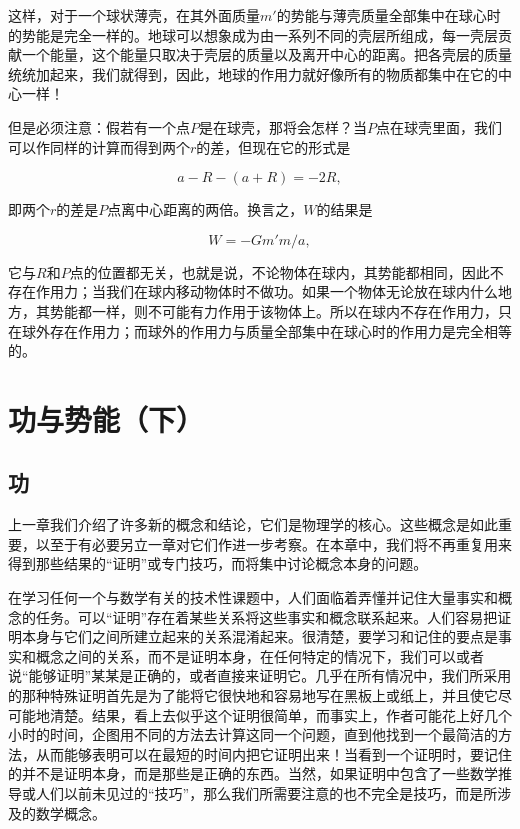 \documentclass[12pt,oneside]{book}
\begin{document}
这样，对于一个球状薄壳，在其外面质量$ m' $的势能与薄壳质量全部集中在球心时的势能是完全一样的。地球可以想象成为由一系列不同的壳层所组成，每一壳层贡献一个能量，这个能量只取决于壳层的质量以及离开中心的距离。把各壳层的质量统统加起来，我们就得到，因此，地球的作用力就好像所有的物质都集中在它的中心一样！

但是必须注意：假若有一个点$ P $是在球壳，那将会怎样？当$ P $点在球壳里面，我们可以作同样的计算而得到两个$ r $的差，但现在它的形式是

\begin{equation*}
a - R - (a + R) = -2R,
\end{equation*}

即两个$ r $的差是$ P $点离中心距离的两倍。换言之，$ W $的结果是

\begin{equation*}
W=-Gm'm/a ,
\end{equation*}

它与$ R $和$ P $点的位置都无关，也就是说，不论物体在球内，其势能都相同，因此不存在作用力；当我们在球内移动物体时不做功。如果一个物体无论放在球内什么地方，其势能都一样，则不可能有力作用于该物体上。所以在球内不存在作用力，只在球外存在作用力；而球外的作用力与质量全部集中在球心时的作用力是完全相等的。



\chapter{功与势能（下）}
\section{功}
上一章我们介绍了许多新的概念和结论，它们是物理学的核心。这些概念是如此重要，以至于有必要另立一章对它们作进一步考察。在本章中，我们将不再重复用来得到那些结果的“证明”或专门技巧，而将集中讨论概念本身的问题。


在学习任何一个与数学有关的技术性课题中，人们面临着弄懂并记住大量事实和概念的任务。可以“证明”存在着某些关系将这些事实和概念联系起来。人们容易把证明本身与它们之间所建立起来的关系混淆起来。很清楚，要学习和记住的要点是事实和概念之间的关系，而不是证明本身，在任何特定的情况下，我们可以或者说“能够证明”某某是正确的，或者直接来证明它。几乎在所有情况中，我们所采用的那种特殊证明首先是为了能将它很快地和容易地写在黑板上或纸上，并且使它尽可能地清楚。结果，看上去似乎这个证明很简单，而事实上，作者可能花上好几个小时的时间，企图用不同的方法去计算这同一个问题，直到他找到一个最简洁的方法，从而能够表明可以在最短的时间内把它证明出来！当看到一个证明时，要记住的并不是证明本身，而是那些是正确的东西。当然，如果证明中包含了一些数学推导或人们以前未见过的“技巧”，那么我们所需要注意的也不完全是技巧，而是所涉及的数学概念。
\end{document}
